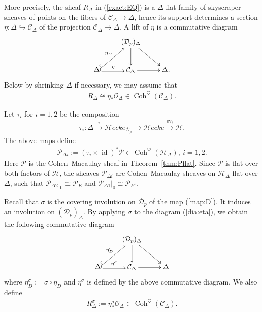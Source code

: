 \documentclass[11pt,oneside,a4paper,mathscr]{amsart}
\makeatletter
\theoremstyle{definition}
\newcommand{\cH}{\mathcal{H}}
\newcommand{\cC}{\mathcal{C}}
\newcommand{\cP}{\mathcal{P}}
\newcommand{\cO}{\mathcal{O}}
\newcommand{\cD}{\mathcal{D}}
\newcommand{\ev}{\mathrm{ev}}
\newcommand{\cHecke}{\mathcal{H}ecke}
\newcommand{\Coh}{\operatorname{Coh}}
\newcommand{\id}{\operatorname{id}}
\newcommand{\inclusion}{\ar@<-0.3ex>@{^{(}->}[r]}
\makeatother
\begin{document}
More precisely, the sheaf $R_{\Delta}$ in (\ref{exact:EQ}) is a $\Delta$-flat family of 
skyscraper sheaves of points on the fibers of $\cC_{\Delta} \to \Delta$, 
hence its support determines a section 
$\eta \colon \Delta \hookrightarrow \cC_{\Delta}$
of the projection $\cC_{\Delta} \to \Delta$. 
A lift of $\eta$ is a commutative diagram 
\begin{align}\label{dia:eta}
    \xymatrix{
    & (\cD_p)_{\Delta} \ar[d] \ar[dr] \\
    \Delta \ar@<-0.3ex>@{^{(}->}[ru]^-{\eta_D} \inclusion^-{\eta} & \cC_{\Delta} \ar[r] & \Delta. 
    }
\end{align}
Below by shrinking $\Delta$ if necessary, we may assume that 
\begin{align*}
    R_{\Delta} \cong \eta_{*}\mathcal{O}_{\Delta} \in \Coh^{\heartsuit}(\cC_{\Delta}).
\end{align*}

Let $\tau_i$ for $i=1, 2$ be the composition 
\begin{align}\label{def:taui}
\tau_i \colon
    \Delta \stackrel{\tau}{\to} \cHecke_{\cD_p} \to \cHecke  \stackrel{\ev_i}{\to}\cH.
\end{align}
The above maps define 
\begin{align*}
    \cP_{\Delta i}:=(\tau_i \times \id)^* \cP\in 
    \Coh^{\heartsuit}(\cH_{\Delta}), \ i=1, 2.
\end{align*}
Here $\cP$ is the Cohen--Macaulay sheaf in Theorem~\ref{thm:Pflat}. 
Since $\cP$ is flat over both factors of $\cH$, 
the sheaves $\cP_{\Delta i}$ are 
Cohen--Macaulay sheaves on $\cH_{\Delta}$ flat over $\Delta$, 
such that $\cP_{\Delta 2}|_{0}\cong \cP_E$ and 
$\cP_{\Delta 1}|_{0}\cong \cP_{E'}$. 

Recall that $\sigma$ is the covering involution on $\cD_p$ of the map (\ref{map:D}).
It induces an involution on $(\cD_p)_{\Delta}$. 
By applying $\sigma$ to the diagram (\ref{dia:eta}), we obtain the following 
commutative diagram 
\begin{align}\label{dia:eta:sigma}
    \xymatrix{
    & (\cD_p)_{\Delta} \ar[d] \ar[dr] \\
    \Delta \ar@<-0.3ex>@{^{(}->}[ru]^-{\eta_D^{\sigma}} \inclusion^-{\eta^{\sigma}} & \cC_{\Delta} \ar[r] & \Delta
    }
\end{align}
where $\eta_D^{\sigma} :=\sigma \circ \eta_D$ and $\eta^{\sigma}$ is defined by the above 
commutative diagram. We also define 
\begin{align*}
    R_{\Delta}^{\sigma}:=\eta^{\sigma}_{*}\cO_{\Delta} \in \Coh^{\heartsuit}(\cC_{\Delta}).
\end{align*}
\end{document}
